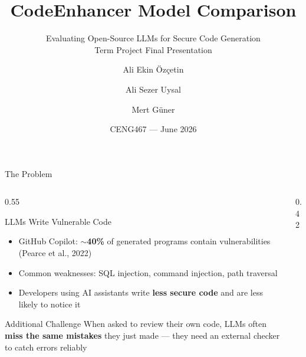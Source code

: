 \documentclass[aspectratio=169]{beamer}
\title[CodeEnhancer Model Comparison]{\textbf{CodeEnhancer Model Comparison}}
\subtitle{Evaluating Open-Source LLMs for Secure Code Generation \\ \vspace{0.3em} \small Term Project Final Presentation}
\author{Ali Ekin Özçetin \and Ali Sezer Uysal \and Mert Güner}
\institute{Izmir Institute of Technology \\ \small Advisor: Prof.\ Dr.\ Aytu\u{g} Onan}
\date{CENG467 --- June 2026}
\begin{document}
\begin{frame}
  \titlepage
\end{frame}

\begin{frame}{The Problem}
  \begin{columns}[T]
    \begin{column}{0.55\textwidth}
      \begin{block}{LLMs Write Vulnerable Code}
        \begin{itemize}
          \item GitHub Copilot: \textbf{$\sim$40\%} of generated programs contain vulnerabilities (Pearce et al., 2022)
          \item Common weaknesses: SQL injection, command injection, path traversal
          \item Developers using AI assistants write \textbf{less secure code} and are less likely to notice it
        \end{itemize}
      \end{block}
      \vspace{0.4em}
      \begin{alertblock}{Additional Challenge}
        When asked to review their own code, LLMs often \textbf{miss the same mistakes} they just made --- they need an external checker to catch errors reliably
      \end{alertblock}
    \end{column}
    \begin{column}{0.42\textwidth}
      \centering
      \vspace{1em}
    \end{column}
  \end{columns}
\end{frame}
\end{document}
